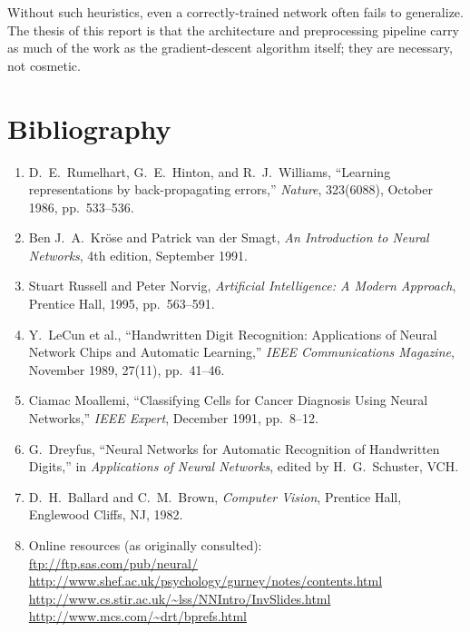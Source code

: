 \documentclass[12pt]{article}
\begin{document}
Without such heuristics, even a correctly-trained network often fails to generalize. The thesis of this report is that the architecture and preprocessing pipeline carry as much of the work as the gradient-descent algorithm itself; they are necessary, not cosmetic.

\section{Bibliography}
\begin{enumerate}[leftmargin=1.2em]
  \item D.\ E.\ Rumelhart, G.\ E.\ Hinton, and R.\ J.\ Williams, ``Learning representations by back-propagating errors,'' \emph{Nature}, 323(6088), October 1986, pp.\ 533--536.
  \item Ben J.\ A.\ Kr\"{o}se and Patrick van der Smagt, \emph{An Introduction to Neural Networks}, 4th edition, September 1991.
  \item Stuart Russell and Peter Norvig, \emph{Artificial Intelligence: A Modern Approach}, Prentice Hall, 1995, pp.\ 563--591.
  \item Y.\ LeCun et al., ``Handwritten Digit Recognition: Applications of Neural Network Chips and Automatic Learning,'' \emph{IEEE Communications Magazine}, November 1989, 27(11), pp.\ 41--46.
  \item Ciamac Moallemi, ``Classifying Cells for Cancer Diagnosis Using Neural Networks,'' \emph{IEEE Expert}, December 1991, pp.\ 8--12.
  \item G.\ Dreyfus, ``Neural Networks for Automatic Recognition of Handwritten Digits,'' in \emph{Applications of Neural Networks}, edited by H.\ G.\ Schuster, VCH.
  \item D.\ H.\ Ballard and C.\ M.\ Brown, \emph{Computer Vision}, Prentice Hall, Englewood Cliffs, NJ, 1982.
  \item Online resources (as originally consulted):\\
  \url{ftp://ftp.sas.com/pub/neural/}\\
  \url{http://www.shef.ac.uk/psychology/gurney/notes/contents.html}\\
  \url{http://www.cs.stir.ac.uk/~lss/NNIntro/InvSlides.html}\\
  \url{http://www.mcs.com/~drt/bprefs.html}
\end{enumerate}
\end{document}
